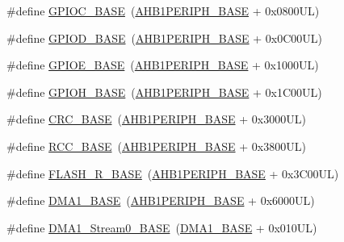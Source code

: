 \begin{DoxyCompactItemize}
\item 
\#define \hyperlink{group___peripheral__memory__map_ga26f267dc35338eef219544c51f1e6b3f}{G\+P\+I\+O\+C\+\_\+\+B\+A\+SE}~(\hyperlink{group___peripheral__memory__map_ga811a9a4ca17f0a50354a9169541d56c4}{A\+H\+B1\+P\+E\+R\+I\+P\+H\+\_\+\+B\+A\+SE} + 0x0800\+U\+L)
\item 
\#define \hyperlink{group___peripheral__memory__map_ga1a93ab27129f04064089616910c296ec}{G\+P\+I\+O\+D\+\_\+\+B\+A\+SE}~(\hyperlink{group___peripheral__memory__map_ga811a9a4ca17f0a50354a9169541d56c4}{A\+H\+B1\+P\+E\+R\+I\+P\+H\+\_\+\+B\+A\+SE} + 0x0\+C00\+U\+L)
\item 
\#define \hyperlink{group___peripheral__memory__map_gab487b1983d936c4fee3e9e88b95aad9d}{G\+P\+I\+O\+E\+\_\+\+B\+A\+SE}~(\hyperlink{group___peripheral__memory__map_ga811a9a4ca17f0a50354a9169541d56c4}{A\+H\+B1\+P\+E\+R\+I\+P\+H\+\_\+\+B\+A\+SE} + 0x1000\+U\+L)
\item 
\#define \hyperlink{group___peripheral__memory__map_gaee4716389f3a1c727495375b76645608}{G\+P\+I\+O\+H\+\_\+\+B\+A\+SE}~(\hyperlink{group___peripheral__memory__map_ga811a9a4ca17f0a50354a9169541d56c4}{A\+H\+B1\+P\+E\+R\+I\+P\+H\+\_\+\+B\+A\+SE} + 0x1\+C00\+U\+L)
\item 
\#define \hyperlink{group___peripheral__memory__map_ga656a447589e785594cbf2f45c835ad7e}{C\+R\+C\+\_\+\+B\+A\+SE}~(\hyperlink{group___peripheral__memory__map_ga811a9a4ca17f0a50354a9169541d56c4}{A\+H\+B1\+P\+E\+R\+I\+P\+H\+\_\+\+B\+A\+SE} + 0x3000\+U\+L)
\item 
\#define \hyperlink{group___peripheral__memory__map_ga0e681b03f364532055d88f63fec0d99d}{R\+C\+C\+\_\+\+B\+A\+SE}~(\hyperlink{group___peripheral__memory__map_ga811a9a4ca17f0a50354a9169541d56c4}{A\+H\+B1\+P\+E\+R\+I\+P\+H\+\_\+\+B\+A\+SE} + 0x3800\+U\+L)
\item 
\#define \hyperlink{group___peripheral__memory__map_ga8e21f4845015730c5731763169ec0e9b}{F\+L\+A\+S\+H\+\_\+\+R\+\_\+\+B\+A\+SE}~(\hyperlink{group___peripheral__memory__map_ga811a9a4ca17f0a50354a9169541d56c4}{A\+H\+B1\+P\+E\+R\+I\+P\+H\+\_\+\+B\+A\+SE} + 0x3\+C00\+U\+L)
\item 
\#define \hyperlink{group___peripheral__memory__map_gab2d8a917a0e4ea99a22ac6ebf279bc72}{D\+M\+A1\+\_\+\+B\+A\+SE}~(\hyperlink{group___peripheral__memory__map_ga811a9a4ca17f0a50354a9169541d56c4}{A\+H\+B1\+P\+E\+R\+I\+P\+H\+\_\+\+B\+A\+SE} + 0x6000\+U\+L)
\item 
\#define \hyperlink{group___peripheral__memory__map_ga0d3c52aa35dcc68f78b704dfde57ba95}{D\+M\+A1\+\_\+\+Stream0\+\_\+\+B\+A\+SE}~(\hyperlink{group___peripheral__memory__map_gab2d8a917a0e4ea99a22ac6ebf279bc72}{D\+M\+A1\+\_\+\+B\+A\+SE} + 0x010\+U\+L)

\end{DoxyCompactItemize}
